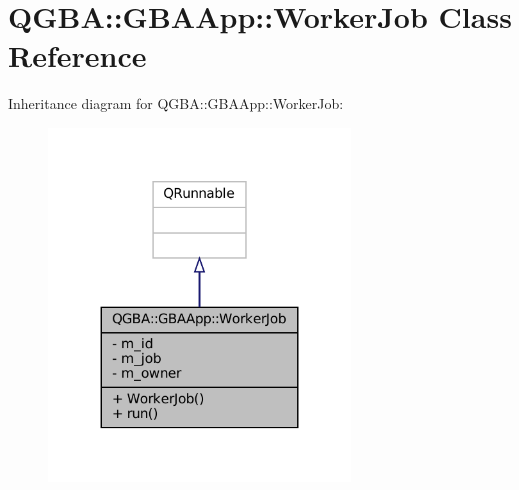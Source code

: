 \hypertarget{class_q_g_b_a_1_1_g_b_a_app_1_1_worker_job}{}\section{Q\+G\+BA\+:\+:G\+B\+A\+App\+:\+:Worker\+Job Class Reference}
\label{class_q_g_b_a_1_1_g_b_a_app_1_1_worker_job}


Inheritance diagram for Q\+G\+BA\+:\+:G\+B\+A\+App\+:\+:Worker\+Job\+:
\nopagebreak
\begin{figure}[H]
\begin{center}
\leavevmode
\includegraphics[width=227pt]{class_q_g_b_a_1_1_g_b_a_app_1_1_worker_job__inherit__graph}
\end{center}
\end{figure}


